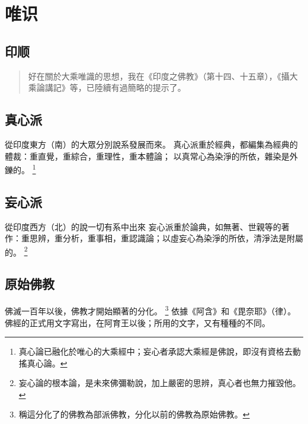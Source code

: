 \section{唯识}
\subsection{印顺}
\begin{quote}
  好在關於大乘唯識的思想，我在《印度之佛教》（第十四、十五章），《攝大乘論講記》等，已陸續有過簡略的提示了。
\end{quote}

\subsection{真心派}
從印度東方（南）的大眾分別說系發展而來。
真心派重於經典，都編集為經典的體裁：重直覺，重綜合，重理性，重本體論； 以真常心為染淨的所依，雜染是外鑠的。
\footnote{真心論已融化於唯心的大乘經中；妄心者承認大乘經是佛說，即沒有資格去動搖真心論。}

\subsection{妄心派}
從印度西方（北）的說一切有系中出來
妄心派重於論典，如無著、世親等的著作：重思辨，重分析，重事相，重認識論；以虛妄心為染淨的所依，清淨法是附屬的。
\footnote{妄心論的根本論，是未來佛彌勒說，加上嚴密的思辨，真心者也無力摧毀他。}

\subsection{原始佛教}
佛滅一百年以後，佛教才開始顯著的分化。
\footnote{稱這分化了的佛教為部派佛教，分化以前的佛教為原始佛教。}
依據《阿含》和《毘奈耶》（律）。
佛經的正式用文字寫出，在阿育王以後；所用的文字，又有種種的不同。
